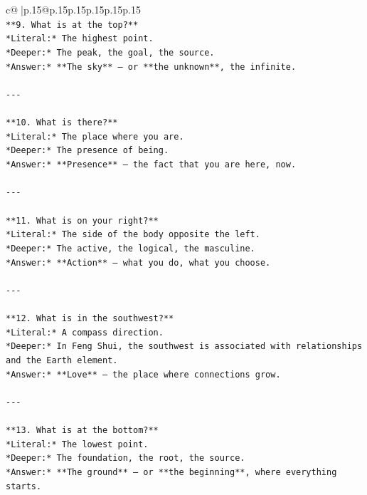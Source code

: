\documentclass{article}
\begin{document}
{\begin{supertabular}{c@{$\;$}|p{.15\linewidth}@{}p{.15\linewidth}p{.15\linewidth}p{.15\linewidth}p{.15\linewidth}p{.15\linewidth}}
{{{\\ 
\texttt{**9. What is at the top?**  } \\
\texttt{*Literal:* The highest point.  } \\
\texttt{*Deeper:* The peak, the goal, the source.  } \\
\texttt{*Answer:* **The sky** — or **the unknown**, the infinite.} \\
\\ 
\texttt{{-}{-}{-}} \\
\\ 
\texttt{**10. What is there?**  } \\
\texttt{*Literal:* The place where you are.  } \\
\texttt{*Deeper:* The presence of being.  } \\
\texttt{*Answer:* **Presence** — the fact that you are here, now.} \\
\\ 
\texttt{{-}{-}{-}} \\
\\ 
\texttt{**11. What is on your right?**  } \\
\texttt{*Literal:* The side of the body opposite the left.  } \\
\texttt{*Deeper:* The active, the logical, the masculine.  } \\
\texttt{*Answer:* **Action** — what you do, what you choose.} \\
\\ 
\texttt{{-}{-}{-}} \\
\\ 
\texttt{**12. What is in the southwest?**  } \\
\texttt{*Literal:* A compass direction.  } \\
\texttt{*Deeper:* In Feng Shui, the southwest is associated with relationships and the Earth element.  } \\
\texttt{*Answer:* **Love** — the place where connections grow.} \\
\\ 
\texttt{{-}{-}{-}} \\
\\ 
\texttt{**13. What is at the bottom?**  } \\
\texttt{*Literal:* The lowest point.  } \\
\texttt{*Deeper:* The foundation, the root, the source.  } \\
\texttt{*Answer:* **The ground** — or **the beginning**, where everything starts.} \\
}}}
\end{supertabular}}
\end{document}
